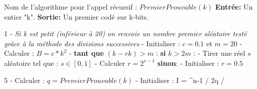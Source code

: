 \documentclass[a4paper,11pt]{article}
\renewcommand{\algorithmicrequire}{\textbf{Entrée:}}
\renewcommand{\algorithmicensure}{\textbf{Sortie:}}
\renewcommand{\algorithmicif}{\textbf{si}}
\renewcommand{\algorithmicelse}{\textbf{sinon}}
\renewcommand{\algorithmicwhile}{\textbf{tant que}}
\begin{document}
\begin{algorithm}[H]
\SetAlgoLined
\newline\newline
Nom de l'algorithme pour l'appel récursif : \newline
\hspace*{5mm}  $PremierProuvable(k)$ \newline
\newline
\algorithmicrequire{ Un entier "k".}\newline
\algorithmicensure{ Un premier codé sur k-bits.}\newline

 1 - \emph{Si k est petit (inférieur à 20) on renvoie un nombre premier aléatoire testé grâce à la méthode des divisions successives } - Initialiser : $c = 0.1$ et $m=20$  - Calculer : $B = c * k^2$  - \algorithmicwhile{ $(k - rk) > m $ :} \newline
 \hspace*{10mm} \algorithmicif{ $k > 2m$ :}\newline
 \hspace*{20mm} - Tirer une réel $s$ aléatoire tel que : $ s \in [0,1] $      \newline
 \hspace*{20mm} - Calculer $r = 2^{s-1}$ \newline
 \hspace*{10mm} \algorithmicelse : \newline
 \hspace*{20mm} - Initialiser :  $r = 0.5$
 
 5 - Calculer : $q = PremierProuvable(k)$  - Initialiser : I = ^{n-1} / 2q \rfloor/ \newline 
 

\end{algorithm}
\end{document}
